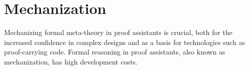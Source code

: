 
\section{Mechanization}
Mechanizing formal meta-theory in proof assistants is crucial, both for the
increased confidence in complex designs and as a basis for technologies such as
proof-carrying code.  Formal reasoning in proof assistants, also known as
mechanization, has high development costs.
